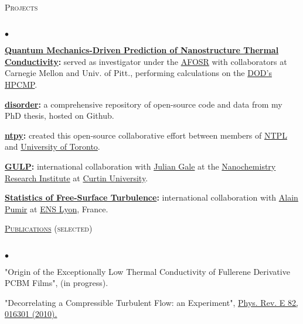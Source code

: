 \documentclass{article}
\newcommand{\lineunder}{\vspace*{-8pt} \\ \hspace*{-18pt} \hrulefill \\}
\newcommand{\header}[1]{{\hspace*{-15pt}\vspace*{6pt} \textsc{#1}} \vspace*{-6pt} \lineunder}
\newenvironment{achievements}{\begin{list}{$\bullet$}{\topsep 0pt \itemsep -2pt}}{\vspace*{4pt}\end{list}}
\begin{document}
\header{Projects}
\begin{achievements}

\item \textbf{\href{http://ntpl.me.cmu.edu/research.html}{Quantum Mechanics-Driven Prediction of Nanostructure Thermal Conductivity}:}
served as investigator under the 
\href{http://www.wpafb.af.mil/afrl/afosr/}{AFOSR} with collaborators at Carnegie Mellon and Univ. of Pitt., performing 
calculations on the \href{http://www.hpcmo.hpc.mil/cms2/index.php}{DOD's HPCMP}.

\item \textbf{\href{https://github.com/jasonlarkin/disorder}{disorder}:} a comprehensive repository of open-source code and data from my PhD thesis, hosted on Github.

\item \textbf{\href{https://github.com/ntpl/ntpy}{ntpy}:} created this open-source  collaborative effort between members of \href{http://ntpl.me.cmu.edu/}{NTPL} and \href{http://www.mie.utoronto.ca/labs/atoms/}{University of Toronto}.

\item \textbf{\href{http://projects.ivec.org/gulp/}{GULP}:} international collaboration with \href{http://nanochemistry.curtin.edu.au/people/staff.cfm/J.Gale}{Julian Gale} at the 
\href{http://nanochemistry.curtin.edu.au/}{Nanochemistry Research Institute} at \href{http://www.curtin.edu.au/}{Curtin University}.

\item \textbf{\href{http://jasonlarkin.github.io/projects-ms.html}{Statistics of Free-Surface Turbulence}:} international collaboration with \href{http://perso.ens-lyon.fr/alain.pumir/Pumir_webpage.html}{Alain Pumir} at \href{http://www.ens-lyon.eu/annuaire/m-pumir-alain-83656.kjsp?RH=ZYZYZYZYZYZYZYZYZYZYZY}{ENS Lyon}, France.

\end{achievements}

\header{\href{http://jasonlarkin.github.io/pub.html}{Publications} (selected)}
\begin{achievements}
\item "Origin of the Exceptionally Low Thermal Conductivity of Fullerene Derivative  PCBM Films", (in progress).
\item "Decorrelating a Compressible Turbulent Flow: an Experiment", \href{http://pre.aps.org/abstract/PRE/v82/i1/e016301}{Phys. Rev. E 82, 016301 (2010).}
\end{achievements}
\end{document}
